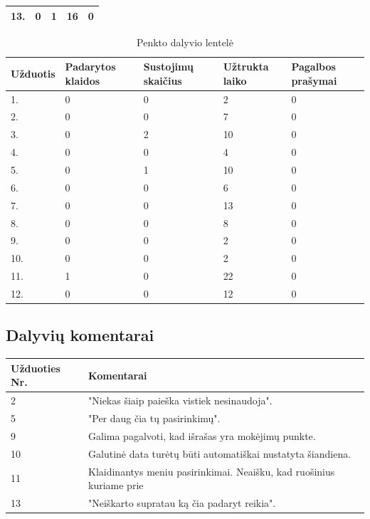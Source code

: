 \documentclass[oneside]{VUMIFPSkursinis}
\begin{document}
\begin{center}
\begin{table}[!pht]
\begin{tabular}{ |p{1.8cm} | p{3.4cm} | p{3.4cm} | p{2.5cm} | p{3.5cm}|}
13.&0&1&16&0 \\ \hline
\end{tabular}
\end{table}
\vspace{0.7cm}
	\begin{table}[!pht]
	\caption{Penkto dalyvio lentelė}
	\begin{tabular}{ |p{1.8cm} | p{3.4cm} | p{3.4cm} | p{2.5cm} | p{3.5cm}|}
	\hline
	Užduotis&Padarytos klaidos&Sustojimų skaičius&Užtrukta laiko&Pagalbos prašymai\\ \hline
1.&0&0&2&0 \\ \hline
2.&0&0&7&0 \\ \hline
3.&0&2&10&0 \\ \hline
4.&0&0&4&0 \\ \hline
5.&0&1&10&0 \\ \hline
6.&0&0&6&0 \\ \hline
7.&0&0&13&0 \\ \hline
8.&0&0&8&0 \\ \hline
9.&0&0&2&0 \\ \hline
10.&0&0&2&0 \\ \hline
11.&1&0&22&0 \\ \hline
12.&0&0&12&0 \\ \hline
\end{tabular}
\end{table}
\vspace{0.7cm}
\end{center}
\subsection{Dalyvių komentarai}
\begin{center}
	\begin{tabular}{ |p{3cm}| p{12cm} |}
	\hline
Užduoties Nr.&Komentarai\\ \hline
2 & "Niekas šiaip paieška vistiek nesinaudoja". \\ \hline
5 & "Per daug čia tų pasirinkimų". \\ \hline
9 & Galima pagalvoti, kad išrašas yra mokėjimų punkte. \\ \hline
10 & Galutinė data turėtų būti automatiškai nustatyta šiandiena. \\ \hline
11 & Klaidinantys meniu pasirinkimai. Neaišku, kad ruošinius kuriame prie \\ \hline
13 & "Neiškarto supratau ką čia padaryt reikia". \\ \hline
	\end{tabular}
\end{center}
\end{document}
